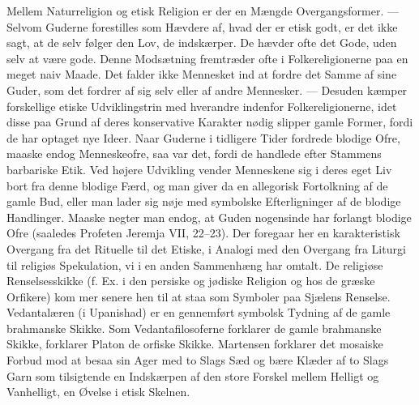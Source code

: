 \documentclass[12pt,a4paper,openany]{book}
\newcommand{\opage}[1]{\marginnote{\footnotesize\textit{[#1]}}}
\begin{document}
Mellem Naturreligion og etisk Religion er der en Mængde Overgangsformer.
--- Selvom Guderne forestilles som Hævdere af, hvad der er etisk godt,
er det ikke sagt, at de selv følger den Lov, de indskærper. De hævder
ofte det Gode, uden selv at være gode. Denne Modsætning fremtræder ofte
i Folkereligionerne paa en meget naiv Maade. Det falder ikke Mennesket
ind at fordre det Samme af sine Guder, som det fordrer af sig selv eller
af andre Mennesker. --- Desuden kæmper forskellige etiske Udviklingstrin
med hverandre indenfor Folkereligionerne, idet disse paa Grund af deres
konservative Karakter nødig slipper gamle Former, fordi de har optaget
nye Ideer. Naar Guderne i tidligere Tider fordrede blodige Ofre, maaske
endog Menneskeofre, saa var det, fordi de handlede efter Stammens
barbariske Etik. Ved højere Udvikling vender Menneskene sig i deres eget
Liv bort fra denne blodige Færd, og man giver da en allegorisk
Fortolkning af de gamle Bud, eller man lader sig nøje med symbolske
Efterligninger af de blodige Handlinger. Maaske negter man endog, at
Guden nogensinde har forlangt blodige Ofre (saaledes Profeten Jeremja
VII, 22--23). Der foregaar her en karakteristisk Overgang fra det
Rituelle til det Etiske, i Analogi med den Overgang fra Liturgi til
religiøs Spekulation, vi i en anden Sammenhæng har omtalt. De religiøse
Renselsesskikke (f. Ex. i den persiske og jødiske Religion og hos de
græske Orfikere) kom%
\opage{213}mer senere hen til at staa som Symboler paa Sjælens Renselse.
Vedantalæren (i Upanishad) er en gennemført symbolsk Tydning af de gamle
brahmanske Skikke. Som Vedantafilosoferne forklarer de gamle brahmanske
Skikke, forklarer Platon de orfiske Skikke. Martensen forklarer det
mosaiske Forbud mod at besaa sin Ager med to Slags Sæd og bære Klæder af
to Slags Garn som tilsigtende en Indskærpen af den store Forskel mellem
Helligt og Vanhelligt, en Øvelse i etisk Skelnen.
\end{document}
